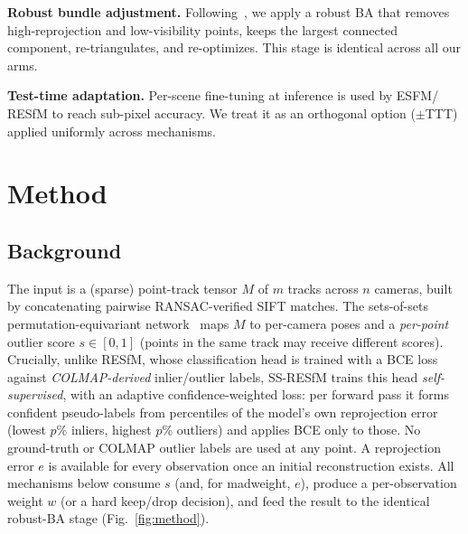 \documentclass{article}
\newcommand{\mad}{madweight}
\begin{document}
\noindent\textbf{Robust bundle adjustment.} Following~\citep{resfm}, we apply a robust BA
that removes high-reprojection and low-visibility points, keeps the largest connected
component, re-triangulates, and re-optimizes. This stage is identical across all our arms.

\noindent\textbf{Test-time adaptation.} Per-scene fine-tuning at inference is used by ESFM/
RESfM to reach sub-pixel accuracy. We treat it as an orthogonal option ($\pm$TTT) applied
uniformly across mechanisms.

\section{Method}
\subsection{Background}
The input is a (sparse) point-track tensor $M$ of $m$ tracks across $n$ cameras, built by
concatenating pairwise RANSAC-verified SIFT matches. The sets-of-sets permutation-equivariant
network~\citep{resfm,esfm} maps $M$ to per-camera poses and a \emph{per-point} outlier score
$s\in[0,1]$ (points in the same track may receive different scores). Crucially, unlike RESfM,
whose classification head is trained with a BCE loss against \emph{COLMAP-derived}
inlier/outlier labels, SS-RESfM trains this head \emph{self-supervised}, with an adaptive
confidence-weighted loss: per forward pass it forms confident pseudo-labels from percentiles
of the model's own reprojection error (lowest $p$\% inliers, highest $p$\% outliers) and
applies BCE only to those. No ground-truth or COLMAP outlier labels are used at any point.
A reprojection error $e$ is available for every observation once an initial reconstruction
exists. All mechanisms below consume $s$ (and, for \mad{}, $e$),
produce a per-observation weight $w$ (or a hard keep/drop decision), and feed the result to
the identical robust-BA stage (Fig.~\ref{fig:method}).
\end{document}
